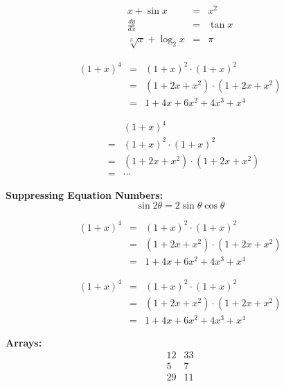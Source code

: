 \documentclass{article}
\begin{document}
\begin{eqnarray} %
x + \sin x &=& x^2 \\
\frac{dy}{dx} &=& \tan x \\
\sqrt[3]{x} + \log_2 x &=& \pi
\end{eqnarray}

\begin{eqnarray} %
(1+x)^4 &=& (1+x)^2\cdot (1+x)^2 \\
&=& (1+2x+x^2)\cdot (1+2x+x^2)\\
&=& 1 + 4x + 6x^2 + 4x^3 + x^4
\end{eqnarray}

\begin{eqnarray} %
&&(1+x)^4 \\
&=& (1+x)^2\cdot (1+x)^2 \\
&=& (1+2x+x^2)\cdot (1+2x+x^2)\\
&=& \cdots
\end{eqnarray}

\vspace{1cm}
\textbf{Suppressing Equation Numbers:}\\

\begin{equation*}
\sin 2\theta = 2 \sin\theta\cos\theta
\end{equation*}


\begin{eqnarray*} %
(1+x)^4 &=& (1+x)^2\cdot (1+x)^2 \\
&=& (1+2x+x^2)\cdot (1+2x+x^2)\\
&=& 1 + 4x + 6x^2 + 4x^3 + x^4
\end{eqnarray*}

\begin{eqnarray} %
(1+x)^4 &=& (1+x)^2\cdot (1+x)^2 \nonumber \\
&=& (1+2x+x^2)\cdot (1+2x+x^2) \\
&=& 1 + 4x + 6x^2 + 4x^3 + x^4 \nonumber
\end{eqnarray}

\newpage %

\textbf{Arrays:}\\

\[ %
\begin{array}{rl} %
12 & 33 \\
5 & 7 \\
29 & 11
\end{array}
\]
\end{document}
